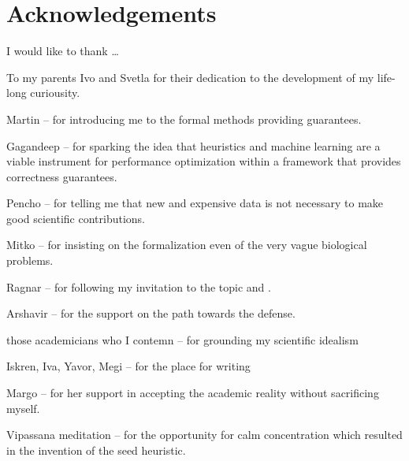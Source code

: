 
\bigskip

\begingroup
\let\clearpage\relax
\let\cleardoublepage\relax
\let\cleardoublepage\relax
\chapter*{Acknowledgements}

\def\thanks#1{%
\begingroup
\leftskip1em
\noindent #1
\par
\endgroup
}

I would like to thank \dots

To my parents Ivo and Svetla for their dedication to the development of my
life-long curiousity.

Martin -- for introducing me to the formal methods providing guarantees.

Gagandeep -- for sparking the idea that heuristics and machine learning are a
viable instrument for performance optimization within a framework that provides
correctness guarantees.

Pencho -- for telling me that new and expensive data is not necessary to make
good scientific contributions.

Mitko -- for insisting on the formalization even of the very vague biological
problems.

Ragnar -- for following my invitation to the topic and .

Arshavir -- for the support on the path towards the defense.

those academicians who I contemn -- for grounding my scientific idealism 

Iskren, Iva, Yavor, Megi -- for the place for writing

Margo -- for her support in accepting the academic reality without sacrificing myself.

Vipassana meditation -- for the opportunity for calm concentration which
resulted in the invention of the seed heuristic.


\endgroup
